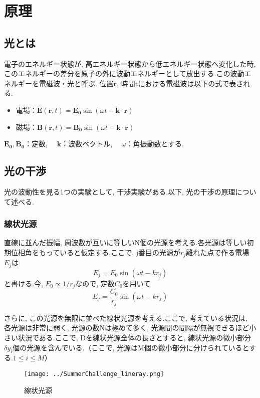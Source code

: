 \section{原理}

\subsection{光とは}
電子のエネルギー状態が, 高エネルギー状態から低エネルギー状態へ変化した時, このエネルギーの差分を原子の外に波動エネルギーとして放出する.この波動エネルギーを電磁波・光と呼ぶ.
位置$\bm{r}$, 時間tにおける電磁波は以下の式で表される.
\begin{itemize}
  \item 電場：$\bm{E} (\bm{r}, t) = \bm{E_0} \sin (\omega t - \bm{k} \cdot \bm{r} ) $
  \item 磁場：$\bm{B} (\bm{r}, t) = \bm{B_0} \sin (\omega t - \bm{k} \cdot \bm{r} ) $
\end{itemize}
$\bm{E_0}, \bm{B_0}$：定数, 　$\bm{k}$：波数ベクトル, 　$\omega$：角振動数とする.

\subsection{光の干渉}
光の波動性を見る1つの実験として, 干渉実験がある.以下, 光の干渉の原理について述べる.
\subsubsection{線状光源}
直線に並んだ振幅, 周波数が互いに等しいN個の光源を考える.各光源は等しい初期位相角をもっていると仮定する.ここで, j番目の光源が$r_j$離れた点で作る電場$E_j$は
\[
  E_j = E_0 \sin(\omega t - k r_j)
\]
と書ける.今, $E_0 \varpropto 1/{r_j}$なので, 定数$C_0$を用いて
\[
  E_j = \frac{C_0}{r_j} \sin(\omega t - k r_j)
\]



さらに, この光源を無限に並べた線状光源を考える.ここで, 考えている状況は, 各光源は非常に弱く, 光源の数Nは極めて多く, 光源間の間隔が無視できるほど小さい状況である.ここで, Dを線状光源全体の長さとすると, 線状光源の微小部分$\delta y_i$個の光源を含んでいる.（ここで, 光源はM個の微小部分に分けられているとする.$1 \leq i \leq M$）
\\
\begin{figure}[b]
  \begin{center}
    \texttt{[image: ../SummerChallenge\_lineray.png]}
    \caption{線状光源}
  \end{center}
\end{figure}

